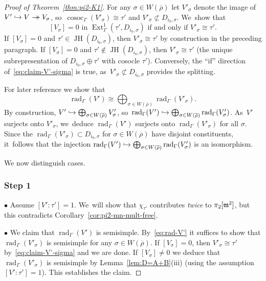 \documentclass[JEP,XML,SOM,Unicode,NoFloatCountersInSection, NoEqCountersInSection,published]{cedram}
\newcommand\hto{\mathrel{\lhook\joinrel\to}}
\newcommand{\onto}{\mathchoice{\to\hspace*{-5mm}\to}{\mathrel{\hbox{$\to\hspace*{-2.85mm}\to$}}}{\to\hspace*{-3mm}\to}{\to\hspace*{-3mm}\to}}
\newcommand{\sbullet}{{\scriptscriptstyle\bullet}}
\newcommand{\brho}{\overline{\rho}}
\DeclareMathOperator{\cosoc}{cosoc}
\DeclareMathOperator{\Ext}{Ext}
\DeclareMathOperator{\JH}{\mathrm{JH}}
\DeclareMathOperator{\rad}{rad}
\theoremstyle{plain}
\theoremstyle{definition}
\begin{document}
\begin{proof}[Proof of Theorem~\ref{thm:pi2-K1}]
For any $\sigma \in W(\brho)$ let $V'_\sigma$ denote the image of $V' \hto V \onto V_\sigma$, so~$\cosoc_{\Gamma}(V'_\sigma) \cong \tau'$ and $V'_\sigma \not\subset D_{i_0,\sigma}$. We~show that
\begin{equation}\label{eq:claim-V'-sigma}
\text{$[V_\sigma] = 0$ in $\Ext^1_\Gamma(\tau',D_{i_0,\sigma})$ if and only if $V'_\sigma \cong \tau'$.}
\end{equation}
If $[V_\sigma] = 0$ and $\tau' \in \JH(D_{i_0,\sigma})$, then $V'_{\sigma} \cong \tau'$ by construction in the preceding paragraph.
If $[V_\sigma] = 0$ and $\tau' \notin \JH(D_{i_0,\sigma})$, then $V'_{\sigma} \cong \tau'$ (the unique subrepresentation of $D_{i_0,\sigma} \oplus \tau'$ with cosocle $\tau'$).
Conversely, the ``if'' direction of~\eqref{eq:claim-V'-sigma} is true, as~\hbox{$V'_\sigma \not\subset D_{i_0,\sigma}$} provides the splitting.

For later reference we show that
\begin{equation}\label{eq:rad-V'}
\rad_{\Gamma}(V') \cong \bigoplus_{\sigma \in W(\brho)} \rad_{\Gamma}(V'_\sigma).
\end{equation}
By construction, $V' \hto \bigoplus_{\sigma \in W(\brho)} V'_\sigma$, so~$\rad_{\Gamma}(V') \hto \bigoplus_{\sigma \in W(\brho)} \rad_{\Gamma}(V'_\sigma)$. As~$V'$ surjects onto $V'_\sigma$, we~deduce $\rad_{\Gamma}(V')$ surjects onto $\rad_{\Gamma}(V'_\sigma)$ for all $\sigma$.
Since the $\rad_{\Gamma}(V'_\sigma) \subset D_{i_0,\sigma}$ for $\sigma \in W(\brho)$ have disjoint constituents, it~follows that the injection $\rad_{\Gamma}(V') \hto \bigoplus_{\sigma \in W(\brho)} \rad_{\Gamma}(V'_\sigma)$ is an isomorphism.

We now distinguish cases.

\subsubsection*{Step 1} $\sbullet$ Assume $[V':\tau'] = 1$. We~will show that $\chi_{\tau'}$ contributes \emph{twice} to $\pi_2[\mathfrak{m}^2]$, but this contradicts Corollary~\ref{cor:pi2-mn-mult-free}.

$\sbullet$ We claim that $\rad_\Gamma(V')$ is semisimple.
By~\eqref{eq:rad-V'} it suffices to show that $\rad_\Gamma(V'_\sigma)$ is semisimple for any $\sigma \in W(\brho)$.
If $[V_{\sigma}] = 0$, then $V'_\sigma \cong \tau'$ by~\eqref{eq:claim-V'-sigma} and we are done.
If $[V_\sigma] \ne 0$ we deduce that $\rad_\Gamma(V'_\sigma)$ is semisimple by Lemma~\ref{lem:D=A+B}(iii) (using the assumption $[V':\tau'] = 1$).
This establishes the claim.


\end{proof}
\end{document}

